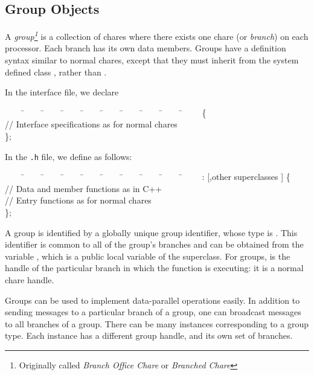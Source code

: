 \subsection{Group Objects}

A {\sl group\footnote{Originally called {\em Branch Office Chare} or 
{\em Branched Chare}}} is a collection of chares where 
there exists one chare (or {\sl branch}) on each
processor.   Each branch has its own data members.  Groups have
a definition syntax similar to normal chares, except that they must
inherit from the system defined class , rather than
.

In the interface file, we declare

\begin{tabbing}
~~~~ \=~~~~ \=~~~~ \=~~~~ \=~~~~ \=~~~~ \=~~~~ \=~~~~ \=~~~~ \=~~~~ \kill
\>   \{ \\
\> \>  // Interface specifications as for normal chares \\
\> \};
\end{tabbing}

In the {\tt .h} file, we define  as follows:

\begin{tabbing}
~~~~ \=~~~~ \=~~~~ \=~~~~ \=~~~~ \=~~~~ \=~~~~ \=~~~~ \=~~~~ \=~~~~ \kill
\>   :  [,other superclasses
] \{ \\
\> \> // Data and member functions as in C++ \\
\> \> // Entry functions as for normal chares \\
\> \};
\end{tabbing}

A group is identified by a globally unique group identifier, whose type is
. This identifier is common to all of the 
group's branches and can be obtained from the variable ,
 which is a public local variable of the  
superclass.  For groups,  is the handle of 
the particular branch in which the function is executing: it is 
a normal chare handle.

Groups can be used to implement data-parallel operations easily.  In
addition to sending messages to a particular branch of a group, one
can broadcast messages to all branches of a group.  There can be many
instances corresponding to a group type.  Each instance has a
different group handle, and its own set of branches.

